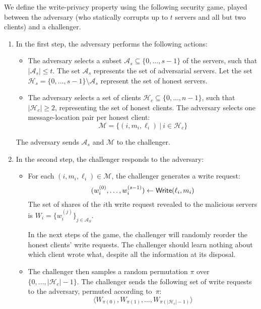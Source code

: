 \documentclass[10pt,twocolumn]{article}
\newcommand{\HH}{\mathcal{H}}
\newcommand{\Adv}{\mathcal{A}}
\newcommand{\MM}{\mathcal{M}}
\begin{document}
\medskip

We define the write-privacy property using the following
security game, played between the adversary (who statically
corrupts up to $t$ servers and all but two clients) and a challenger.
\begin{enumerate}
  \item In the first step, the adversary performs the following actions: 
        \begin{itemize}
            \item The adversary selects 
              a subset $\Adv_s \subseteq \{0, \dots, s-1\}$
              of the servers, such that $|\Adv_s| \leq t$.
              The set $\Adv_s$ represents the
              set of adversarial servers. 
              Let the set $\HH_s = \{0, \dots, s-1\} \setminus \Adv_s$
              represent the set of honest servers.

            \item The adversary selects a set of clients $\HH_c \subseteq \{0, \dots, n-1\}$,
                  such that $|\HH_c| \geq 2$, representing the set of honest clients.
                  The adversary selects
                  one message-location pair per honest client:
                \[ \MM = \{ (i, m_i, \ell_i) \ |\ i \in \HH_c \} \]

        \end{itemize}
        The adversary sends $\Adv_s$ and $\MM$ to the challenger.

  \item In the second step, the challenger responds to the adversary:
        \begin{itemize}
        \item 
        For each $(i, m_i, \ell_i) \in \mathcal{M}$, the challenger generates 
        a write request: 
        \[ (w^{(0)}_i, \dots, w^{(s-1)}_{i}) \gets {\sf Write}(\ell_i, m_i) \]
        The set of shares of the $i$th write request revealed to the
        malicious servers is $W_i = \{w^{(j)}_i\}_{j \in \Adv_S}$.

        In the next steps of the game, the challenger will randomly reorder the honest
        clients' write requests. 
        The challenger should learn nothing about which client wrote what,
        despite all the information at its disposal.

        \item
        The challenger then samples a random permutation $\pi$ over
        $\{0, \dots, |\mathcal{H}_c|-1 \}$.
        The challenger sends the following set of write requests to the adversary,
        permuted according to~$\pi$:
        \[ \langle W_{\pi(0)}, W_{\pi(1)}, \dots, W_{\pi(|\HH_c|-1)} \rangle \]
        \end{itemize}


\end{enumerate}
\end{document}
